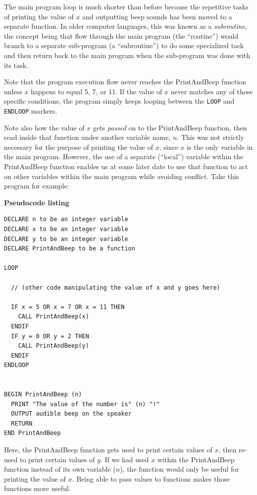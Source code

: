 \vskip 10pt

The main program loop is much shorter than before because the repetitive tasks of printing the value of $x$ and outputting beep sounds has been moved to a separate function.  In older computer languages, this was known as a \textit{subroutine}, the concept being that flow through the main program (the ``routine'') would branch to a separate sub-program (a ``subroutine'') to do some specialized task and then return back to the main program when the sub-program was done with its task.

Note that the program execution flow never reaches the PrintAndBeep function unless $x$ happens to equal 5, 7, or 11.  If the value of $x$ never matches any of those specific conditions, the program simply keeps looping between the \texttt{LOOP} and \texttt{ENDLOOP} markers.

\filbreak

Note also how the value of $x$ gets \textit{passed} on to the PrintAndBeep function, then read inside that function under another variable name, $n$.  This was not strictly necessary for the purpose of printing the value of $x$, since $x$ is the only variable in the main program.  However, the use of a separate (``local'') variable within the PrintAndBeep function enables us at some later date to use that function to act on other variables within the main program while avoiding conflict.  Take this program for example:

\vskip 10pt

\textbf{Pseudocode listing}

\lstset{language=pseudocode}
\begin{lstlisting}
DECLARE n to be an integer variable
DECLARE x to be an integer variable
DECLARE y to be an integer variable
DECLARE PrintAndBeep to be a function

LOOP
 
  // (other code manipulating the value of x and y goes here)

  IF x = 5 OR x = 7 OR x = 11 THEN 
    CALL PrintAndBeep(x)
  ENDIF
  IF y = 0 OR y = 2 THEN 
    CALL PrintAndBeep(y)
  ENDIF
ENDLOOP


BEGIN PrintAndBeep (n)
  PRINT "The value of the number is" (n) "!"
  OUTPUT audible beep on the speaker
  RETURN
END PrintAndBeep

\end{lstlisting}

\vskip 10pt

Here, the PrintAndBeep function gets used to print certain values of $x$, then re-used to print certain values of $y$.  If we had used $x$ within the PrintAndBeep function instead of its own variable ($n$), the function would only be useful for printing the value of $x$.  Being able to pass values to functions makes those functions more useful.

